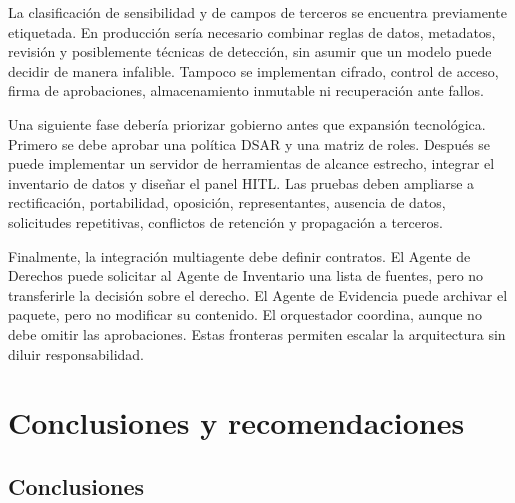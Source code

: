 \documentclass[11pt,a4paper]{article}
\begin{document}
La clasificación de sensibilidad y de campos de terceros se encuentra previamente etiquetada. En producción sería necesario combinar reglas de datos, metadatos, revisión y posiblemente técnicas de detección, sin asumir que un modelo puede decidir de manera infalible. Tampoco se implementan cifrado, control de acceso, firma de aprobaciones, almacenamiento inmutable ni recuperación ante fallos.

Una siguiente fase debería priorizar gobierno antes que expansión tecnológica. Primero se debe aprobar una política DSAR y una matriz de roles. Después se puede implementar un servidor de herramientas de alcance estrecho, integrar el inventario de datos y diseñar el panel HITL. Las pruebas deben ampliarse a rectificación, portabilidad, oposición, representantes, ausencia de datos, solicitudes repetitivas, conflictos de retención y propagación a terceros.

Finalmente, la integración multiagente debe definir contratos. El Agente de Derechos puede solicitar al Agente de Inventario una lista de fuentes, pero no transferirle la decisión sobre el derecho. El Agente de Evidencia puede archivar el paquete, pero no modificar su contenido. El orquestador coordina, aunque no debe omitir las aprobaciones. Estas fronteras permiten escalar la arquitectura sin diluir responsabilidad.

\section{Conclusiones y recomendaciones}

\subsection{Conclusiones}
\end{document}
